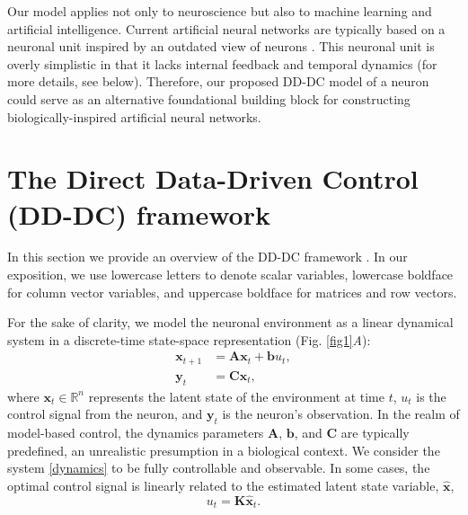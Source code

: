 \documentclass[9pt,twocolumn,twoside]{pnas-new}
\begin{document}
Our model applies not only to neuroscience but also to machine learning and artificial intelligence. Current artificial neural networks are typically based on a neuronal unit inspired by an outdated view of neurons \citep{mcculloch1943logical,rosenblatt1961principles}. This neuronal unit is overly simplistic in that it lacks internal feedback and temporal dynamics (for more details, see below). Therefore, our proposed DD-DC model of a neuron could serve as an alternative foundational building block for constructing biologically-inspired artificial neural networks. %


\section*{The Direct Data-Driven Control (DD-DC) framework}


In this section we provide an overview of the DD-DC framework \citep{de2019formulas,willems2005note,markovsky2022data}. In our exposition, we use lowercase letters to denote scalar variables, lowercase boldface for column vector variables, and uppercase boldface for matrices and row vectors.

For the sake of clarity, we model the neuronal environment as a linear dynamical system in a discrete-time state-space representation (Fig. \ref{fig1}{\it A}):
\begin{align}
\label{dynamics}
\mathbf{x}_{t+1} & = \mathbf{Ax}_t + \mathbf{b}u_t, \\
\mathbf{y}_t & = \mathbf{Cx}_t,
\end{align}
where $\mathbf{x}_t\in\mathbb{R}^n$ represents the latent state of the environment at time $t$, $u_t$ is the control signal from the neuron, and $\mathbf{y}_t$ is the neuron's observation. In the realm of model-based control, the dynamics parameters $\mathbf{A}$, $\mathbf{b}$, and $\mathbf{C}$ are typically predefined, an unrealistic presumption in a biological context. We consider the system \eqref{dynamics} to be fully controllable and observable. In some cases, the optimal control signal is linearly related to the estimated latent state variable, $\mathbf{\hat{x}}$,
\begin{equation}
\label{control_law}
u_t=\mathbf{K} \mathbf{\hat{x}}_t.
\end{equation}
\end{document}
